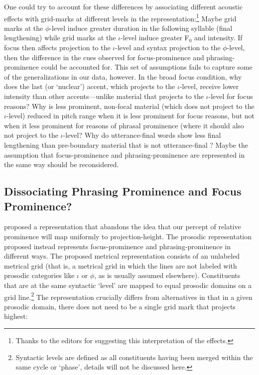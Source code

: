 \documentclass[preprint,review,12pt,authoryear,times]{elsarticle}
\begin{document}
One could try to account for these differences by associating different acoustic effects with grid-marks at different levels in the representation:\footnote{Thanks to the editors for suggesting this interpretation of the effects.} Maybe grid marks at the $\phi$-level induce greater duration in the following syllable (final lengthening) while grid marks at the $\iota$-level induce greater F$_0$ and intensity. If focus then affects projection to the $\iota$-level and syntax projection to the $\phi$-level, then the difference in the cues observed for focus-prominence and phrasing-prominence could be accounted for. This set of assumptions fails to capture some of the generalizations in our data, however. In the broad focus condition, why does the last (or `nuclear') accent, which projects to the $\iota$-level, receive lower intensity than other accents---unlike material that projects to the $\iota$-level for focus reasons? Why is less prominent, non-focal material (which does not project to the $\iota$-level) reduced in pitch range when it is less prominent for focus reasons, but not when it less prominent for reasons of phrasal prominence (where it should also not project to the $\iota$-level?  Why do utterance-final words show less final lengthening than pre-boundary material that is not utterance-final \citep{wagner05recursion}? Maybe the assumption that focus-prominence and phrasing-prominence are represented in the same way should be reconsidered.


\subsection{Dissociating Phrasing Prominence and Focus Prominence?}

\citet{wagner05recursion} proposed a representation that abandons the idea that our percept of relative prominence will map uniformly to projection-height. The prosodic representation proposed instead represents focus-prominence and phrasing-prominence in different ways. The proposed metrical representation consists of an unlabeled metrical grid (that is, a metrical grid in which the lines are not labeled with prosodic categories like $\iota$ or $\phi$, as is usually assumed elsewhere). Constituents that are at the same syntactic `level'  are mapped to equal prosodic domains on a grid line.\footnote{Syntactic levels are defined as all constituents having been merged within the same cycle or `phase', details will not be discussed here.}  The representation crucially differs from alternatives in that in a given prosodic domain, there does not need to be a single grid mark that projects highest:
\end{document}
